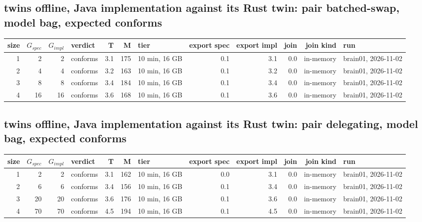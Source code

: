 \documentclass[10pt]{article}
\begin{document}
\subsection*{twins offline, Java implementation against its Rust twin: pair \textsf{batched-swap}, model bag, expected conforms}
\begin{longtable}{@{}rrrlrrlrrrrl@{}}
\toprule
size & $G_{\mathit{spec}}$ & $G_{\mathit{impl}}$ & verdict & T & M & tier & export spec & export impl & join & join kind & run \\
\midrule
\endhead
\color{red} 1 & 2 & 2 & conforms & 3.1 & 175 & 10 min, 16 GB & 0.1 & 3.1 & 0.0 & in-memory & brain01, 2026-11-02 \\
\color{red} 2 & 4 & 4 & conforms & 3.2 & 163 & 10 min, 16 GB & 0.1 & 3.2 & 0.0 & in-memory & brain01, 2026-11-02 \\
\color{red} 3 & 8 & 8 & conforms & 3.4 & 184 & 10 min, 16 GB & 0.1 & 3.4 & 0.0 & in-memory & brain01, 2026-11-02 \\
\color{red} 4 & 16 & 16 & conforms & 3.6 & 168 & 10 min, 16 GB & 0.1 & 3.6 & 0.0 & in-memory & brain01, 2026-11-02 \\
\bottomrule
\end{longtable}
\subsection*{twins offline, Java implementation against its Rust twin: pair \textsf{delegating}, model bag, expected conforms}
\begin{longtable}{@{}rrrlrrlrrrrl@{}}
\toprule
size & $G_{\mathit{spec}}$ & $G_{\mathit{impl}}$ & verdict & T & M & tier & export spec & export impl & join & join kind & run \\
\midrule
\endhead
\color{red} 1 & 2 & 2 & conforms & 3.1 & 162 & 10 min, 16 GB & 0.0 & 3.1 & 0.0 & in-memory & brain01, 2026-11-02 \\
\color{red} 2 & 6 & 6 & conforms & 3.4 & 156 & 10 min, 16 GB & 0.1 & 3.4 & 0.0 & in-memory & brain01, 2026-11-02 \\
\color{red} 3 & 20 & 20 & conforms & 3.6 & 176 & 10 min, 16 GB & 0.1 & 3.6 & 0.0 & in-memory & brain01, 2026-11-02 \\
\color{red} 4 & 70 & 70 & conforms & 4.5 & 194 & 10 min, 16 GB & 0.1 & 4.5 & 0.0 & in-memory & brain01, 2026-11-02 \\
\bottomrule
\end{longtable}
\end{document}
